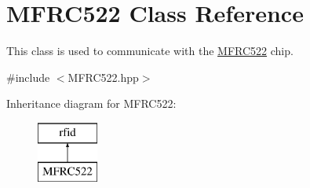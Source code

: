 \hypertarget{class_m_f_r_c522}{}\section{M\+F\+R\+C522 Class Reference}
\label{class_m_f_r_c522}


This class is used to communicate with the \mbox{\hyperlink{class_m_f_r_c522}{M\+F\+R\+C522}} chip.  




{\ttfamily \#include $<$M\+F\+R\+C522.\+hpp$>$}

Inheritance diagram for M\+F\+R\+C522\+:\begin{figure}[H]
\begin{center}
\leavevmode
\includegraphics[height=2.000000cm]{class_m_f_r_c522}
\end{center}
\end{figure}
